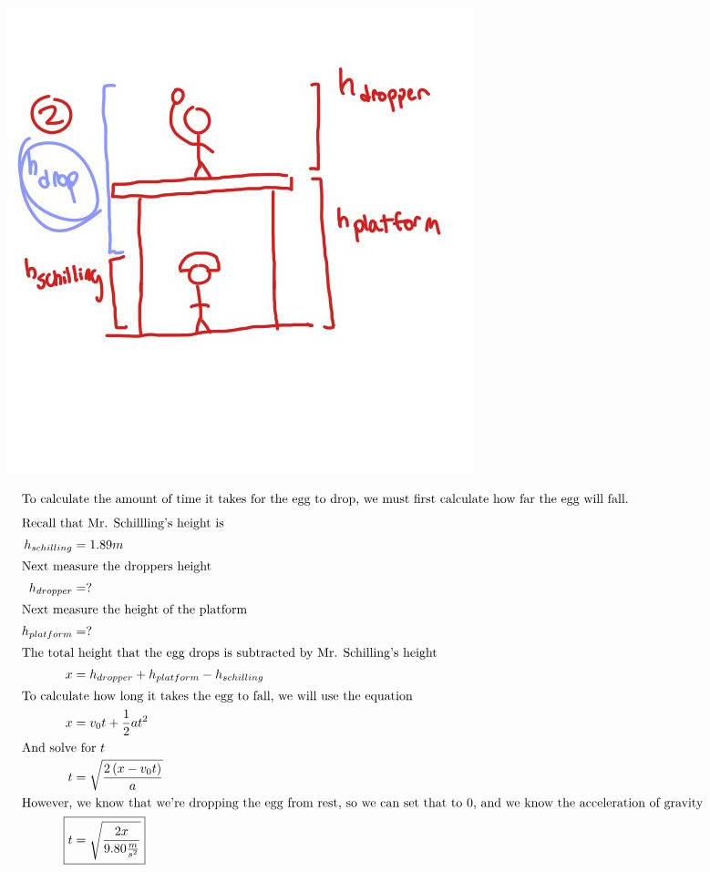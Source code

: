 \documentclass[12pt]{article}
\begin{document}
\begin{figure}[H]
	\begin{center}
		\includegraphics[scale=2]{2.JPEG}
	\end{center}
\end{figure}

\begin{align*}
	\intertext{To calculate the amount of time it takes for the egg to drop, we must first calculate how far the egg will fall. }
	\intertext{Recall that Mr. Schillling's height is }
	h_{schilling} & =1.89m                                   \\
	\intertext{Next measure the droppers height}
	h_{dropper}   & =?                                       \\
	\intertext{Next measure the height of the platform}
	h_{platform}  & =?                                       \\
	\intertext{The total height that the egg drops is subtracted by Mr. Schilling's height}
	x             & =h_{dropper}+h_{platform}-h_{schilling}  \\
	\intertext{To calculate how long it takes the egg to fall, we will use the equation}
	x             & =v_{0}t+\frac{1}{2}at^{2}                \\
	\intertext{And solve for \(t\)}
	t             & =\sqrt{\frac{2\left(x-v_{0}t\right)}{a}} \\
	\intertext{However, we know that we're dropping the egg from rest, so we can set that to 0, and we know the acceleration of gravity}
	\Aboxed{t     & =\sqrt{\frac{2x}{9.80\frac{m}{s^{2}}}}}  \\
\end{align*}
\end{document}
